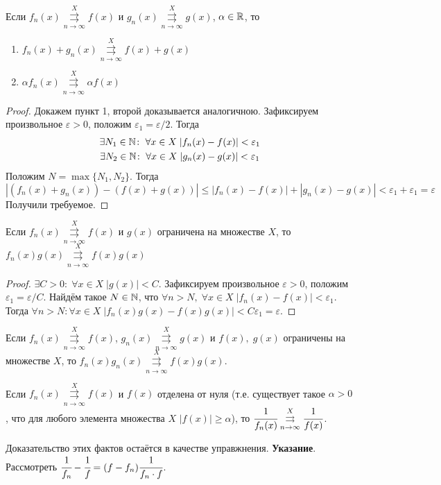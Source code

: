 \documentclass[a4paper, 12pt]{article}
\begin{document}
	\begin{Statement}
		Если $f_n(x) \overset{X}{\underset{n\to\infty}{\rightrightarrows}} f(x)$ и $g_n(x) \overset{X}{\underset{n\to\infty}{\rightrightarrows}} g(x)$, $\alpha \in \mathbb{R}$, то 
		\begin{enumerate}
			\item $f_n(x) + g_n(x) \overset{X}{\underset{n\to\infty}{\rightrightarrows}} f(x) + g(x)$
			\item $\alpha f_n(x) \overset{X}{\underset{n\to\infty}{\rightrightarrows}} \alpha f(x)$
		\end{enumerate}
	\end{Statement}
	\begin{proof}
		Докажем пункт 1, второй доказывается аналогичною. Зафиксируем произвольное $\varepsilon > 0$, положим $\varepsilon_1 = \varepsilon / 2$. Тогда
		\begin{gather*}
			\exists N_1 \in \mathbb{N}\colon \; \forall x\in X\; |f_n(x) - f(x) | < \varepsilon_1\\
			\exists N_2 \in \mathbb{N}\colon \; \forall x\in X\; |g_n(x) - g(x) | < \varepsilon_1\\
		\end{gather*}
		Положим $N = \max\{N_1, N_2\}$. Тогда
		$$
			|(f_n(x) + g_n(x)) - (f(x) + g(x))| \leqslant |f_n(x) - f(x)| + |g_n(x) - g(x)| < \varepsilon_1 + \varepsilon_1 = \varepsilon
		$$
		Получили требуемое.
	\end{proof}
	\begin{Statement}
		Если $f_n(x)\overset{X}{\underset{n\to\infty}{\rightrightarrows}} f(x)$ и $g(x)$ ограничена на множестве $X$, то $f_n(x)g(x) \overset{X}{\underset{n\to\infty}{\rightrightarrows}} f(x) g(x)$
	\end{Statement}
	\begin{proof}
		$\exists C>0\colon\; \forall x\in X\; |g(x)| < C$. Зафиксируем произвольное $\varepsilon > 0$, положим $\varepsilon_1 = \varepsilon/C$. Найдём такое $N\in \mathbb{N}$, что 
		$\forall n>N,\; \forall x\in X\; |f_n(x) - f(x)| < \varepsilon_1$. Тогда $\forall n >N\colon \forall x\in X\; |f_n(x)g(x) - f(x)g(x)| < C\varepsilon_1 = \varepsilon$. 
	\end{proof}
	\begin{Comment}
		Если $f_n(x) \overset{X}{\underset{n\to\infty}{\rightrightarrows}} f(x)$, $g_n(x) \overset{X}{\underset{n\to\infty}{\rightrightarrows}} g(x)$ и $f(x),\; g(x)$ ограничены на множестве $X$, то $f_n(x)g_n(x)\overset{X}{\underset{n\to\infty}{\rightrightarrows}} f(x)g(x)$.
	\end{Comment}
	\begin{Comment}
		Если $f_n(x) \overset{X}{\underset{n\to\infty}{\rightrightarrows}} f(x)$ и $f(x)$ отделена от нуля (т.е. существует такое $\alpha>0$, что для любого элемента множества $X$ $|f(x)| \geqslant \alpha$), то $\cfrac{1}{f_n(x)} \overset{X}{\underset{n\to\infty}{\rightrightarrows}} \cfrac{1}{f(x)}$. 
	\end{Comment}
	Доказательство этих фактов остаётся в качестве управжнения. \textbf{Указание}. Рассмотреть $\cfrac{1}{f_n} - \cfrac{1}{f} = (f-f_n)\cfrac{1}{f_n\cdot f}$.
\end{document}
